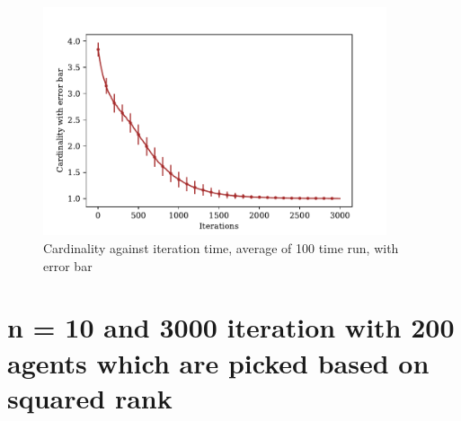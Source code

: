 \documentclass[a4paper,12pt]{article}
\begin{document}
	\begin{figure}[H]
		\centering
		\includegraphics[width=0.9\textwidth]{card_errbar200_3000}
		\caption{Cardinality against iteration time, average of 100 time run, with error bar}\label{card_errbar200_3000}
	\end{figure}
\section{n = 10 and 3000 iteration with 200 agents which are picked based on squared rank}\label{sqrank}
\end{document}
